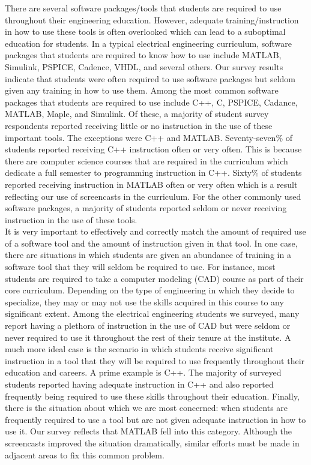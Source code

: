 \documentclass[a4paper,10pt]{article}
\begin{document}
There are several software packages/tools that students are required to use throughout their engineering education. However, adequate training/instruction in how to use these tools is often overlooked which can lead to a suboptimal education for students. In a typical electrical engineering curriculum, software packages that students are required to know how to use include MATLAB, Simulink, PSPICE, Cadence, VHDL, and several others. Our survey results indicate that students were often required to use  software packages but seldom given any training in how to use them.  Among the most common software packages that students are required to use include C++, C, PSPICE, Cadance, MATLAB, Maple, and Simulink.  Of these, a majority of student survey respondents reported receiving little or no instruction in the use of these important tools.  The exceptions were C++ and MATLAB. Seventy-seven\% of students reported receiving C++ instruction often or very often.  This is because there are computer science courses that are required in the curriculum which dedicate a full semester to programming instruction in C++.  Sixty\% of students reported receiving instruction in MATLAB often or very often which is a result reflecting our use of screencasts in the curriculum.  For the other commonly used software packages, a majority of students reported seldom or never receiving instruction in the use of these tools. 
\\

It is very important to effectively and correctly match the amount of required use of a software tool and the amount of instruction given in that tool.  In one case, there are situations in which students are given an abundance of training in a software tool that they will seldom be required to use.  For instance, most students are required to take a computer modeling (CAD) course as part of their core curriculum.  Depending on the type of engineering in which they decide to specialize, they may or may not use the skills acquired in this course to any significant extent.  Among the electrical engineering students we surveyed, many report having a plethora of instruction in the use of CAD but were seldom or never required to use it throughout the rest of their tenure at the institute.
A much more ideal case is the scenario in which students receive significant instruction in a tool that they will be required to use frequently throughout their education and careers.  A prime example is C++.  The majority of surveyed students reported having adequate instruction in C++ and also reported frequently being required to use these skills throughout their education.  Finally, there is the situation about which we are most concerned: when students are frequently required to use a tool but are not given adequate instruction in how to use it.  Our survey reflects that MATLAB fell into this category.  Although the screencasts improved the situation dramatically, similar efforts must be made in adjacent areas to fix this common problem.  
\end{document}
